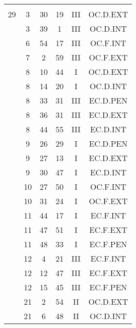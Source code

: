 \documentclass[12pt, a4paper]{article}
\begin{document}
\begin{multicols}{3}
{\begin{tabular}{c c c c c c}
	 	 	 	 & & & & & \\%
	 	 	 	29 & 3 & 30 & 19 & III & OC.D.EXT\\%
	 	 	 	 & 3 & 39 & 1 & III & OC.D.INT\\%
	 	 	 	 & 6 & 54 & 17 & III & OC.F.INT\\%
	 	 	 	 & 7 & 2 & 59 & III & OC.F.EXT\\%
	 	 	 	 & 8 & 10 & 44 & I & OC.D.EXT\\%
	 	 	 	 & 8 & 14 & 20 & I & OC.D.INT\\%
	 	 	 	 & 8 & 33 & 31 & III & EC.D.PEN\\%
	 	 	 	 & 8 & 36 & 31 & III & EC.D.EXT\\%
	 	 	 	 & 8 & 44 & 55 & III & EC.D.INT\\%
	 	 	 	 & 9 & 26 & 29 & I & EC.D.PEN\\%
	 	 	 	 & 9 & 27 & 13 & I & EC.D.EXT\\%
	 	 	 	 & 9 & 30 & 47 & I & EC.D.INT\\%
	 	 	 	 & 10 & 27 & 50 & I & OC.F.INT\\%
	 	 	 	 & 10 & 31 & 24 & I & OC.F.EXT\\%
	 	 	 	 & 11 & 44 & 17 & I & EC.F.INT\\%
	 	 	 	 & 11 & 47 & 51 & I & EC.F.EXT\\%
	 	 	 	 & 11 & 48 & 33 & I & EC.F.PEN\\%
	 	 	 	 & 12 & 4 & 21 & III & EC.F.INT\\%
	 	 	 	 & 12 & 12 & 47 & III & EC.F.EXT\\%
	 	 	 	 & 12 & 15 & 45 & III & EC.F.PEN\\%
	 	 	 	 & 21 & 2 & 54 & II & OC.D.EXT\\%
	 	 	 	 & 21 & 6 & 48 & II & OC.D.INT\\%

\end{tabular}}
\end{multicols}
\end{document}
